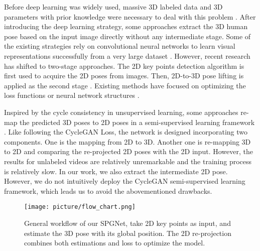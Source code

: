 \documentclass[runningheads]{llncs}
\begin{document}
Before deep learning was widely used, massive 3D labeled data and 3D parameters with prior knowledge were necessary to deal with this problem \cite{Andriluka_20110_IEEE}. After introducing the deep learning strategy, some approaches extract the 3D human pose based on the input image directly without any intermediate stage. Some of the existing strategies rely on convolutional neural networks to learn visual representations successfully from a very large dataset \cite{Sun_2018_ECCV,Pavlakos_2017_CVPR}. However, recent research has shifted to two-stage approaches. The 2D key points detection algorithm is first used to acquire the 2D poses from images. Then, 2D-to-3D pose lifting is applied as the second stage \cite{Chen_2016_CVPR,Pavlakos_2018,MartinezHRL17}. Existing methods have focused on optimizing the loss functions or neural network structures \cite{Chen_2016_CVPR,Pavlakos_2018,MartinezHRL17,temporal_convolutions_and_semi_supervised}. 

Inspired by the cycle consistency in unsupervised learning, some approaches re-map the predicted 3D poses to 2D poses in a semi-supervised learning framework \cite{temporal_convolutions_and_semi_supervised}. Like following the CycleGAN Loss, the network is designed incorporating two components. One is the mapping from 2D to 3D. Another one is re-mapping 3D to 2D and comparing the re-projected 2D poses with the 2D input. However, the results for unlabeled videos are relatively unremarkable and the training process is relatively slow. In our work, we also extract the intermediate 2D pose. However, we do not intuitively deploy the CycleGAN semi-supervised learning framework, which leads us to avoid the abovementioned drawbacks. 


\begin{figure}[!t]
\texttt{[image: picture/flow\_chart.png]}
\caption{General workflow of our SPGNet, take 2D key points as input, and estimate the 3D pose with its global position. The 2D re-projection combines both estimations and loss to optimize the model.} \label{flow_chart}
\end{figure}
\end{document}
